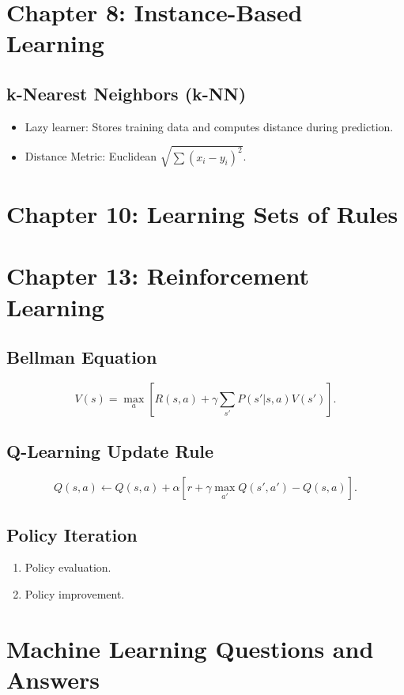 \documentclass[10pt,a4paper]{article}
\begin{document}
\section*{Chapter 8: Instance-Based Learning}
\subsection*{k-Nearest Neighbors (k-NN)}
\begin{itemize}
	\item Lazy learner: Stores training data and computes distance during prediction.
	\item Distance Metric: Euclidean \( \sqrt{\sum (x_i - y_i)^2} \).
\end{itemize}


\section*{Chapter 10: Learning Sets of Rules}

\section*{Chapter 13: Reinforcement Learning}
\subsection*{Bellman Equation}
\[
V(s) = \max_a \left[ R(s, a) + \gamma \sum_{s'} P(s'|s, a)V(s') \right].
\]

\subsection*{Q-Learning Update Rule}
\[
Q(s, a) \leftarrow Q(s, a) + \alpha \left[ r + \gamma \max_{a'} Q(s', a') - Q(s, a) \right].
\]

\subsection*{Policy Iteration}
\begin{enumerate}
    \item Policy evaluation.
    \item Policy improvement.
\end{enumerate}


\section*{Machine Learning Questions and Answers}
\end{document}
